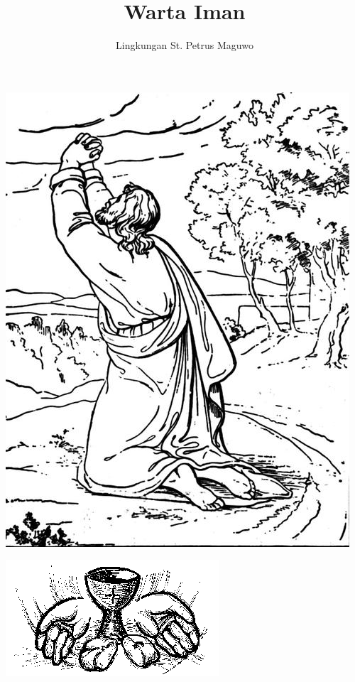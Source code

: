 \documentclass[a5paper,titlepage,10pt,openany]{scrbook}
\author{Lingkungan St. Petrus Maguwo}
\title{Warta Iman}
\begin{document}
\thispagestyle{empty}

\setlength{\parindent}{1cm}
\pagestyle{plain}

\begin{center}
\includegraphics[scale=0.45]{gambar/jesus-praying.jpg}
\end{center}




\begin{center}
\includegraphics[scale=0.65]{gambar/t0915.png}
\end{center}



\end{document}
